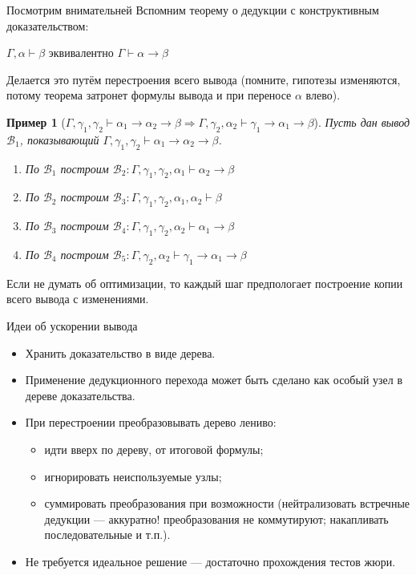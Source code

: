 \documentclass[aspectratio=169]{beamer}
\newtheorem{exm}{Пример}[section]
\begin{document}
\begin{frame}{Посмотрим внимательней}
Вспомним теорему о дедукции с конструктивным доказательством: 
\begin{center}$\Gamma,\alpha\vdash\beta$ эквивалентно
$\Gamma\vdash\alpha\rightarrow\beta$\end{center}
Делается это путём перестроения всего вывода (помните, гипотезы изменяются,
потому теорема затронет формулы вывода и при переносе $\alpha$ влево).

\begin{exm}[$\Gamma,\gamma_1,\gamma_2\vdash\alpha_1\rightarrow\alpha_2\rightarrow\beta\Rightarrow\Gamma,\gamma_2,\alpha_2\vdash\gamma_1\rightarrow\alpha_1\rightarrow\beta$]
Пусть дан вывод $\mathcal{B}_1$, показывающий $\Gamma,\gamma_1,\gamma_2\vdash\alpha_1\rightarrow\alpha_2\rightarrow\beta$.
\begin{enumerate}
\item По $\mathcal{B}_1$ построим $\mathcal{B}_2: \Gamma,\gamma_1,\gamma_2,\alpha_1\vdash\alpha_2\rightarrow\beta$
\item По $\mathcal{B}_2$ построим $\mathcal{B}_3: \Gamma,\gamma_1,\gamma_2,\alpha_1,\alpha_2\vdash\beta$
\item По $\mathcal{B}_3$ построим $\mathcal{B}_4: \Gamma,\gamma_1,\gamma_2,\alpha_2\vdash\alpha_1\rightarrow\beta$
\item По $\mathcal{B}_4$ построим $\mathcal{B}_5: \Gamma,\gamma_2,\alpha_2\vdash\gamma_1\rightarrow\alpha_1\rightarrow\beta$
\end{enumerate}
\end{exm}

Если не думать об оптимизации, то каждый шаг предпологает построение копии всего вывода с изменениями.
\end{frame}

\begin{frame}{Идеи об ускорении вывода}
\begin{itemize}
\item Хранить доказательство в виде дерева.
\item Применение дедукционного перехода может быть сделано как особый узел в дереве доказательства.
\item При перестроении преобразовывать дерево лениво:
\begin{itemize}
\item идти вверх по дереву, от итоговой формулы;
\item игнорировать неиспользуемые узлы;
\item суммировать преобразования при возможности (нейтрализовать встречные дедукции --- аккуратно! преобразования не коммутируют;
накапливать последовательные и т.п.).
\end{itemize}
\item Не требуется идеальное решение --- достаточно прохождения тестов жюри.
\end{itemize}
\end{frame}
\end{document}
